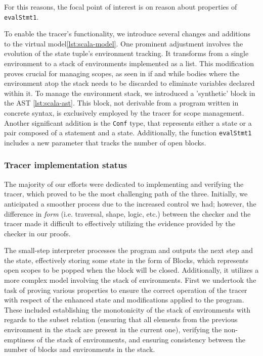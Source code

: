 For this reasons, the focal point of interest is on reason about properties of \texttt{evalStmt1}.

To enable the tracer's functionality, we introduce several changes and additions to the virtual model\ref{lst:scala-model}. One prominent adjustment involves the evolution of the state tuple's environment tracking. It transforms from a single environment to a stack of environments implemented as a list. This modification proves crucial for managing scopes, as seen in if and while bodies where the environment atop the stack needs to be discarded to eliminate variables declared within it. To manage the environment stack, we introduced a 'synthetic' block in the AST \ref{lst:scala-ast}. This block, not derivable from a program written in concrete syntax, is exclusively employed by the tracer for scope management. Another significant addition is the \texttt{Conf} type, that represents either a state or a pair composed of a statement and a state. Additionally, the function \texttt{evalStmt1} includes a new parameter that tracks the number of open blocks.

\subsubsection{Tracer implementation status}

The majority of our efforts were dedicated to implementing and verifying the tracer, which proved to be the most challenging path of the three. Initially, we anticipated a smoother process due to the increased control we had; however, the difference in \textit{form} (i.e. traversal, shape, logic, etc.) between the checker and the tracer made it difficult to effectively utilizing the evidence provided by the checker in our proofs.


The small-step interpreter processes the program and outputs the next step and the state, effectively storing some state in the form of Blocks, which represents open scopes to be popped when the block will be closed. Additionally, it utilizes a more complex model involving the stack of environments. First we undertook the task of proving various properties to ensure the correct operation of the tracer with respect of the enhanced state and modifications applied to the program.
These included establishing the monotonicity of the stack of environments with regards to the subset relation (ensuring that all elements from the previous environment in the stack are present in the current one), verifying the non-emptiness of the stack of environments, and ensuring consistency between the number of blocks and environments in the stack.

